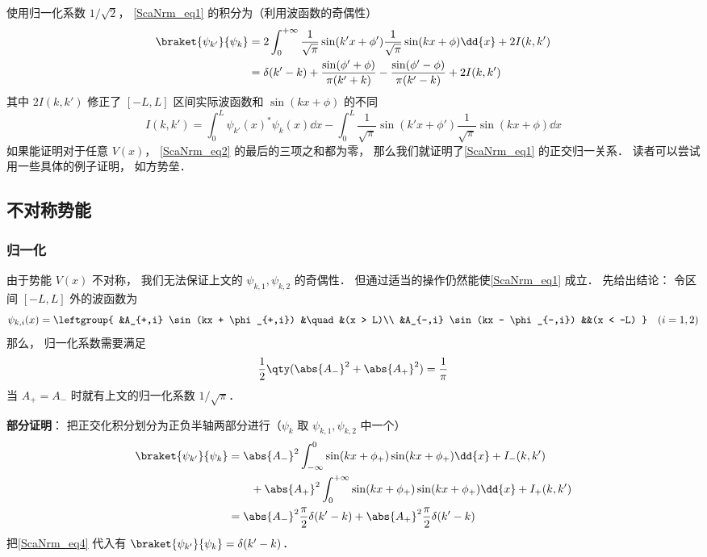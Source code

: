 使用归一化系数 $1/\sqrt{2}$， \autoref{ScaNrm_eq1} 的积分为（利用波函数的奇偶性）
\begin{equation}\label{ScaNrm_eq2}
\begin{aligned}
\braket{\psi_{k'}}{\psi_k} &= 2\int_{0}^{+\infty} \frac{1}{\sqrt{\pi}}\sin(k'x+\phi')\frac{1}{\sqrt{\pi}}\sin(kx+\phi) \dd{x} + 2I(k,k')\\
&= \delta(k'-k) + \frac{\sin(\phi'+\phi)}{\pi(k'+k)} - \frac{\sin(\phi'-\phi)}{\pi(k'-k)} + 2I(k,k')
\end{aligned}
\end{equation}
其中 $2I(k,k')$ 修正了 $[-L,L]$ 区间实际波函数和 $\sin(kx+\phi)$ 的不同
\begin{equation}
I(k,k') = \int_0^L \psi_{k'}(x)^* \psi_k(x) \dd{x}
-\int_{0}^{L} \frac{1}{\sqrt{\pi}}\sin(k'x+\phi') \frac{1}{\sqrt{\pi}}\sin(kx+\phi) \dd{x}
\end{equation}
如果能证明对于任意 $V(x)$， \autoref{ScaNrm_eq2} 的最后的三项之和都为零， 那么我们就证明了\autoref{ScaNrm_eq1} 的正交归一关系． 读者可以尝试用一些具体的例子证明， 如方势垒．

\subsection{不对称势能}
\subsubsection{归一化}
由于势能 $V(x)$ 不对称， 我们无法保证上文的 $\psi_{k,1},\psi_{k,2}$ 的奇偶性． 但通过适当的操作仍然能使\autoref{ScaNrm_eq1} 成立． 先给出结论： 令区间 $[-L,L]$ 外的波函数为
\begin{equation}\label{ScaNrm_eq9}
\psi_{k,i}(x) = \leftgroup{
    &A_{+,i} \sin(kx + \phi_{+,i}) &\quad &(x > L)\\
    &A_{-,i} \sin(kx - \phi_{-,i}) &&(x < -L)
} \quad (i = 1,2)
\end{equation}
那么， 归一化系数需要满足
\begin{equation}\label{ScaNrm_eq4}
\frac{1}{2}\qty(\abs{A_-}^2 + \abs{A_+}^2) = \frac{1}{\pi}
\end{equation}
当 $A_+ = A_-$ 时就有上文的归一化系数 $1/\sqrt{\pi}$．

\textbf{部分证明}： 把正交化积分划分为正负半轴两部分进行（$\psi_{k}$ 取 $\psi_{k,1}, \psi_{k,2}$ 中一个）
\begin{equation}
\begin{aligned}
\braket{\psi_{k'}}{\psi_{k}} &= \abs{A_-}^2\int_{-\infty}^0 \sin(kx + \phi_{+})\sin(kx + \phi_{+}) \dd{x} + I_-(k,k')\\
&\qquad+ \abs{A_+}^2\int_0^{+\infty} \sin(kx + \phi_{+})\sin(kx + \phi_{+}) \dd{x}   + I_+(k,k')\\
&= \abs{A_-}^2\frac{\pi}{2}\delta(k'-k) + \abs{A_+}^2 \frac{\pi}{2} \delta(k'-k)
\end{aligned}
\end{equation}
把\autoref{ScaNrm_eq4} 代入有 $\braket{\psi_{k'}}{\psi_{k}} = \delta(k'-k)$．

